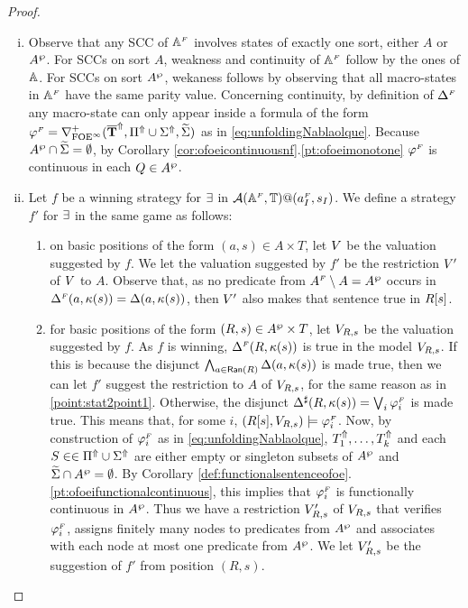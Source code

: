 \begin{proof}
\begin{enumerate}[(i)]
\item Observe that any SCC
of $\mathbb{A}^{{\scriptscriptstyle F}}$ involves states of exactly one sort, either $A$ or $A^{\wp}$. For SCCs on sort $A$, weakness and continuity of $\mathbb{A}^{{\scriptscriptstyle F}}$ follow by the ones of $\mathbb{A}$. For SCCs on sort $A^{\wp}$, wekaness follows by observing that all macro-states in $\mathbb{A}^{{\scriptscriptstyle F}}$ have the same parity value. Concerning continuity, by definition of $\Delta^{{\scriptscriptstyle F}}$ any macro-state can only appear inside a formula of the form $\varphi^{{\scriptscriptstyle F}} = \nabla^+_{\mathrm{FOE}^{\infty}}(\overline{{\mathbf{T}}}^{\Uparrow},\Pi^{\Uparrow} \cup \Sigma^{\Uparrow},\widetilde{\Sigma})$ as in \eqref{eq:unfoldingNablaolque}. Because $A^{\wp} \cap \widetilde{\Sigma} = \emptyset$, by Corollary \ref{cor:ofoeicontinuousnf}.\ref{pt:ofoeimonotone} $\varphi^{{\scriptscriptstyle F}}$ is continuous in each $Q \in A^{\wp}$.
  \item  Let $f$ be a winning strategy for $\exists$ in $\mathcal{A}(\mathbb{A}^{{\scriptscriptstyle F}},\mathbb{T})@(a_I^{{\scriptscriptstyle F}},s_I)$. We define a strategy $f'$ for $\exists$ in the same game as follows:
      \begin{enumerate}[label=(\alph*),ref=\alph*]
        \item on basic positions of the form $(a,s) \in A\times T$, let $V$ be the valuation suggested by $f$. We let the valuation suggested by $f'$ be the restriction $V'$ of $V$ to $A$. Observe that, as no predicate from $A^{{\scriptscriptstyle F}}\setminus A =A^{\wp}$ occurs in $\Delta^{{\scriptscriptstyle F}}(a,\kappa(s)) = \Delta(a,\kappa(s))$, then $V'$ also makes that sentence true in $R[s]$.
        \label{point:stat2point1}
        \item for basic positions of the form $(R,s) \in A^{\wp} \times T$, let $V_{R,s}$ be the valuation suggested by $f$. As $f$ is winning, $\Delta^{{\scriptscriptstyle F}}(R,\kappa(s))$ is true in the model $V_{R,s}$. If this is because the disjunct $\bigwedge_{a \in \mathsf{Ran}(R)} \Delta(a,\kappa(s))$ is made true, then we can let $f'$ suggest the restriction to $A$ of $V_{R,s}$, for the same reason as in \eqref{point:stat2point1}. Otherwise, the disjunct $\Delta^{\sharp}(R,\kappa(s)) = \bigvee_{i}\varphi_i^{{\scriptscriptstyle F}}$ is made true. This means that, for some $i$, $(R[s], V_{R,s}) \models \varphi_i^{{\scriptscriptstyle F}}$.
             Now, by construction of $\varphi_i^{{\scriptscriptstyle F}}$ as in \eqref{eq:unfoldingNablaolque}, $T^{\Uparrow}_1,\dots,T^{\Uparrow}_k$ and each $S \in \in \Pi^{\Uparrow} \cup \Sigma^{\Uparrow}$ are either empty or singleton subsets of $A^{\wp}$ and $\widetilde{\Sigma} \cap A^{\wp} = \emptyset$. By Corollary \ref{def:functionalsentenceofoe}.\ref{pt:ofoeifunctionalcontinuous}, this implies that $\varphi_i^{{\scriptscriptstyle F}}$ is functionally continuous in $A^{\wp}$. Thus we have a restriction $V_{R,s}'$ of $V_{R,s}$ that verifies $\varphi_i^{{\scriptscriptstyle F}}$, assigns finitely many nodes to predicates from $A^{\wp}$ and associates with each node at most one predicate from $A^{\wp}$. We let $V_{R,s}'$ be the suggestion of $f'$ from position $(R,s)$.

\end{enumerate}
\end{enumerate}
\end{proof}
